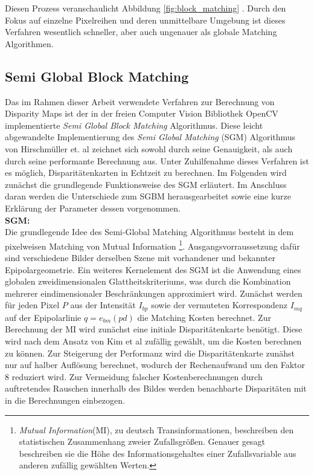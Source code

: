 \noindent
Diesen Prozess veranschaulicht Abbildung \ref{fig:block_matching} . Durch den Fokus auf einzelne Pixelreihen und deren unmittelbare Umgebung ist dieses Verfahren wesentlich schneller, aber auch ungenauer als globale Matching Algorithmen. 
 

\subsection{Semi Global Block Matching}
\label{subsec:stereo_matching_sgbm}
Das im Rahmen dieser Arbeit verwendete Verfahren zur Berechnung von Disparity Maps ist der in der freien Computer Vision Bibliothek OpenCV \cite{opencv} implementierte \emph{Semi Global Block Matching} Algorithmus. Diese leicht abgewandelte Implementierung des \emph{Semi Global Matching} (SGM) Algorithmus von Hirschmüller et. al \cite{hirschmuller2005sgm} zeichnet sich sowohl durch seine Genauigkeit, als auch durch seine performante Berechnung aus. Unter Zuhilfenahme dieses Verfahren ist es möglich, Disparitätenkarten in Echtzeit zu berechnen. Im Folgenden wird zunächst die grundlegende Funktionsweise des SGM erläutert. Im Anschluss daran werden die Unterschiede zum SGBM herausgearbeitet sowie eine kurze Erklärung der Parameter dessen vorgenommen.\\

\noindent
\textbf{SGM:} \\
Die grundlegende Idee des Semi-Global Matching Algorithmus besteht in dem pixelweisen Matching von Mutual Information \footnote{\emph{Mutual Information}(MI), zu deutsch Transinformationen, beschreiben den statistischen Zusammenhang zweier Zufallsgrößen. Genauer gesagt beschreiben sie die Höhe des Informationsgehaltes einer Zufallsvariable aus anderen zufällig gewählten Werten.}. Ausgangsvorraussetzung dafür sind verschiedene Bilder derselben Szene mit vorhandener und bekannter Epipolargeometrie. Ein weiteres Kernelement des SGM ist die Anwendung eines globalen zweidimensionalen Glattheitskriteriums, was durch die Kombination mehrerer eindimensionaler Beschränkungen approximiert wird. Zunächst werden für jeden Pixel $P$ aus der Intensität $I_{bp}$ sowie der vermuteten Korrespondenz $I_{mq}$ auf der Epipolarlinie $q=e_{bm}(pd)$ die Matching Kosten berechnet. Zur Berechnung der MI wird zunächst eine initiale Disparitätenkarte benötigt. Diese wird nach dem Ansatz von Kim et al \cite{lee2012intelligent} zufällig gewählt, um die Kosten berechnen zu können. Zur Steigerung der Performanz wird die Disparitätenkarte zunähst nur auf halber Auflösung berechnet, wodurch der Rechenaufwand um den Faktor $8$ reduziert wird. Zur Vermeidung falscher Kostenberechnungen durch auftretendes Rauschen innerhalb des Bildes werden benachbarte Disparitäten mit in die Berechnungen einbezogen.\\


